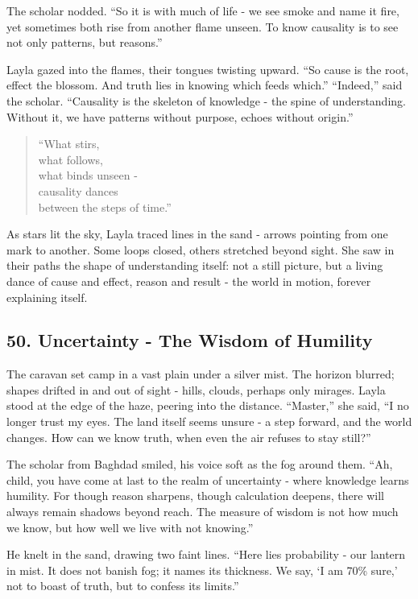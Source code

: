 \documentclass[
  letterpaper,
  DIV=11,
  numbers=noendperiod]{scrreprt}
\begin{document}
The scholar nodded. ``So it is with much of life - we see smoke and name
it fire, yet sometimes both rise from another flame unseen. To know
causality is to see not only patterns, but reasons.''

Layla gazed into the flames, their tongues twisting upward. ``So cause
is the root, effect the blossom. And truth lies in knowing which feeds
which.'' ``Indeed,'' said the scholar. ``Causality is the skeleton of
knowledge - the spine of understanding. Without it, we have patterns
without purpose, echoes without origin.''

\begin{quote}
``What stirs,\\
what follows,\\
what binds unseen -\\
causality dances\\
between the steps of time.''
\end{quote}

As stars lit the sky, Layla traced lines in the sand - arrows pointing
from one mark to another. Some loops closed, others stretched beyond
sight. She saw in their paths the shape of understanding itself: not a
still picture, but a living dance of cause and effect, reason and result
- the world in motion, forever explaining itself.

\subsection{50. Uncertainty - The Wisdom of
Humility}\label{uncertainty---the-wisdom-of-humility}

The caravan set camp in a vast plain under a silver mist. The horizon
blurred; shapes drifted in and out of sight - hills, clouds, perhaps
only mirages. Layla stood at the edge of the haze, peering into the
distance. ``Master,'' she said, ``I no longer trust my eyes. The land
itself seems unsure - a step forward, and the world changes. How can we
know truth, when even the air refuses to stay still?''

The scholar from Baghdad smiled, his voice soft as the fog around them.
``Ah, child, you have come at last to the realm of uncertainty - where
knowledge learns humility. For though reason sharpens, though
calculation deepens, there will always remain shadows beyond reach. The
measure of wisdom is not how much we know, but how well we live with not
knowing.''

He knelt in the sand, drawing two faint lines. ``Here lies probability -
our lantern in mist. It does not banish fog; it names its thickness. We
say, `I am 70\% sure,' not to boast of truth, but to confess its
limits.''
\end{document}
